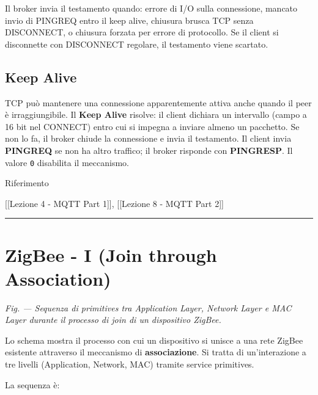 \documentclass[
  italian,
  openany]{book}
\begin{document}
Il broker invia il testamento quando: errore di I/O sulla connessione,
mancato invio di PINGREQ entro il keep alive, chiusura brusca TCP senza
DISCONNECT, o chiusura forzata per errore di protocollo. Se il client si
disconnette con DISCONNECT regolare, il testamento viene scartato.

\subsection{Keep Alive}\label{keep-alive-1}

TCP può mantenere una connessione apparentemente attiva anche quando il
peer è irraggiungibile. Il \textbf{Keep Alive} risolve: il client
dichiara un intervallo (campo a 16 bit nel CONNECT) entro cui si impegna
a inviare almeno un pacchetto. Se non lo fa, il broker chiude la
connessione e invia il testamento. Il client invia \textbf{PINGREQ} se
non ha altro traffico; il broker risponde con \textbf{PINGRESP}. Il
valore \texttt{0} disabilita il meccanismo.

\begin{calloutnote}{Riferimento}

{[}{[}Lezione 4 - MQTT Part 1{]}{]}, {[}{[}Lezione 8 - MQTT Part 2{]}{]}

\end{calloutnote}

\begin{center}\rule{0.5\linewidth}{0.5pt}\end{center}

\section{ZigBee - I (Join through
Association)}\label{zigbee---i-join-through-association}

\emph{Fig. --- Sequenza di primitives tra Application Layer, Network
Layer e MAC Layer durante il processo di join di un dispositivo ZigBee.}

Lo schema mostra il processo con cui un dispositivo si unisce a una rete
ZigBee esistente attraverso il meccanismo di \textbf{associazione}. Si
tratta di un'interazione a tre livelli (Application, Network, MAC)
tramite service primitives.

La sequenza è:
\end{document}
